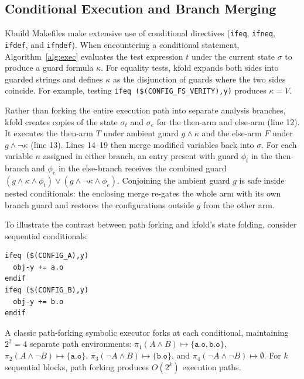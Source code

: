 \documentclass[acmsmall]{acmart}
\newcommand{\tool}{\textsf{kfold}\xspace}
\begin{document}
\subsection{Conditional Execution and Branch Merging}\label{sec:technique:merge}

Kbuild Makefiles make extensive use of conditional directives (\texttt{ifeq}, \texttt{ifneq}, \texttt{ifdef}, and \texttt{ifndef}).
When encountering a conditional statement, Algorithm~\ref{alg:exec} evaluates the test expression $t$ under the current state $\sigma$ to produce a guard formula $\kappa$.
For equality tests, \tool expands both sides into guarded strings and defines $\kappa$ as the disjunction of guards where the two sides coincide.
For example, testing \texttt{ifeq (\$(CONFIG\_FS\_VERITY),y)} produces $\kappa = V$.

Rather than forking the entire execution path into separate analysis branches, \tool creates copies of the state $\sigma_t$ and $\sigma_e$ for the then-arm and else-arm (line 12).
It executes the then-arm $T$ under ambient guard $g \land \kappa$ and the else-arm $F$ under $g \land \neg\kappa$ (line 13).
Lines 14--19 then merge modified variables back into $\sigma$.
For each variable $n$ assigned in either branch, an entry present with guard $\phi_t$ in the then-branch and $\phi_e$ in the else-branch receives the combined guard $(g \land \kappa \land \phi_t) \lor (g \land \neg\kappa \land \phi_e)$.
Conjoining the ambient guard $g$ is safe inside nested conditionals: the enclosing merge re-gates the whole arm with its own branch guard and restores the configurations outside $g$ from the other arm.

To illustrate the contrast between path forking and \tool's state folding, consider sequential conditionals:
\begin{lstlisting}[style=kbuild-example]
ifeq ($(CONFIG_A),y)
  obj-y += a.o
endif
ifeq ($(CONFIG_B),y)
  obj-y += b.o
endif
\end{lstlisting}
A classic path-forking symbolic executor forks at each conditional, maintaining $2^2 = 4$ separate path environments:
$\pi_1(A \land B) \mapsto \{\texttt{a.o}, \texttt{b.o}\}$, $\pi_2(A \land \neg B) \mapsto \{\texttt{a.o}\}$, $\pi_3(\neg A \land B) \mapsto \{\texttt{b.o}\}$, and $\pi_4(\neg A \land \neg B) \mapsto \emptyset$.
For $k$ sequential blocks, path forking produces $O(2^k)$ execution paths.
\end{document}
